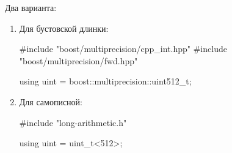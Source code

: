 Два варианта:
\begin{enumerate}
  \item Для бустовской длинки: 
  \begin{cppcode}
#include "boost/multiprecision/cpp_int.hpp"
#include "boost/multiprecision/fwd.hpp"

using uint = boost::multiprecision::uint512_t;
  \end{cppcode}
  \item Для самописной:
  \begin{cppcode}
#include "long-arithmetic.h"

using uint = uint_t<512>;
  \end{cppcode}
\end{enumerate}
